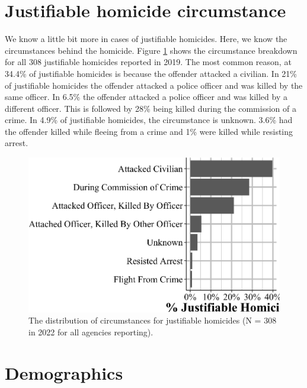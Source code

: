 \documentclass[
  12pt,
  openany]{book}
\begin{document}
\section{Justifiable homicide circumstance}\label{justifiable-homicide-circumstance}

We know a little bit more in cases of justifiable homicides. Here, we know the circumstances behind the homicide. Figure \ref{fig:victimJustifiableHomicide} shows the circumstance breakdown for all 308 justifiable homicides reported in 2019. The most common reason, at 34.4\% of justifiable homicides is because the offender attacked a civilian. In 21\% of justifiable homicides the offender attacked a police officer and was killed by the same officer. In 6.5\% the offender attacked a police officer and was killed by a different officer. This is followed by 28\% being killed during the commission of a crime. In 4.9\% of justifiable homicides, the circumstance is unknown. 3.6\% had the offender killed while fleeing from a crime and 1\% were killed while resisting arrest.

\begin{figure}

{\centering \includegraphics[width=0.9\linewidth]{15_nibrs_victim_files/figure-latex/victimJustifiableHomicide-1} 

}

\caption{The distribution of circumstances for justifiable homicides (N = 308 in 2022 for all agencies reporting).}\label{fig:victimJustifiableHomicide}
\end{figure}

\section{Demographics}\label{demographics-2}
\end{document}
